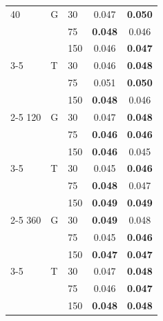 \documentclass[12pt]{article}
\theoremstyle{plain}
\theoremstyle{remark}
\begin{document}
\begin{table}
\begin{tabular}{lllcc}
		 40 & G  & 30 & 0.047 & \bf 0.050 \\ 
		 & &  75 & \bf 0.048 & 0.046  \\ 
		 & & 150 & 0.046 & \bf 0.047  \\ 
		\cline{3-5}
		 & T & 30 & 0.046 & \bf 0.048 \\ 
		 & &  75 & 0.051 & \bf  0.050 \\ 
		 & & 150 & \bf 0.048 & 0.046  \\ 
		 \cline{2-5}
		 120 & G  & 30 & 0.047 & \bf 0.048 \\ 
		 & &  75 & \bf 0.046 & \bf 0.046 \\ 
		 & & 150 & \bf 0.046 &  0.045 \\ 
		\cline{3-5}
		 & T & 30 & 0.045 & \bf 0.046 \\ 
		 & &  75 & \bf 0.048 &  0.047 \\ 
		 & & 150 & \bf 0.049 & \bf 0.049 \\ 
		 \cline{2-5}
		 360 & G  & 30 & \bf 0.049  & 0.048 \\ 
		 & &  75 & 0.045 & \bf 0.046  \\ 
		 & & 150 & \bf 0.047 & \bf 0.047  \\ 
		\cline{3-5}
		 & T & 30 &0.047 & \bf 0.048 \\ 
		 & &  75 & 0.046 & \bf 0.047  \\ 
		 & & 150 & \bf 0.048 & \bf 0.048 \\ 
		 \hline
	\end{tabular}
\end{table}
\end{document}
